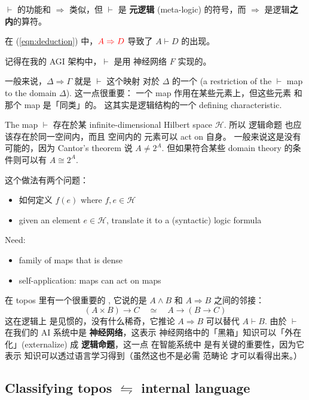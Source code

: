 $\vdash$ 的功能和 $\Rightarrow$ 类似，但 $\vdash$ 是 \textbf{元逻辑} (meta-logic) 的符号，而 $\Rightarrow$ 是逻辑\textbf{之内}的算符。

在 (\ref{eqn:deduction}) 中，${\color{red} A \Rightarrow D}$ 导致了 $A \vdash D$ 的出现。

记得在我的 AGI 架构中，$\vdash$ 是用 神经网络 $F$ 实现的。 

一般来说，$\Delta \Rightarrow \Gamma$ 就是 $\vdash$ 这个映射 对於 $\Delta$ 的一个  (a restriction of the $\vdash$ map to the domain $\Delta$).  这一点很重要： 一个 map 作用在某些元素上，但这些元素 和那个 map 是「同类」的。 这其实是逻辑结构的一个 defining characteristic.

The map $\vdash$ 存在於某 infinite-dimensional Hilbert space $\mathcal{H}$.  所以 逻辑命题 也应该存在於同一空间内，而且 空间内的 元素可以 act on 自身。 一般来说这是没有可能的，因为 Cantor's theorem 说 $A \neq 2^A$.  但如果符合某些 domain theory 的条件则可以有 $A \cong 2^A$.

这个做法有两个问题：
\begin{itemize}
	\item 如何定义 $f(e)$ where $f, e \in \mathcal{H}$
	\item given an element $e \in \mathcal{H}$, translate it to a (syntactic) logic formula
\end{itemize}

Need:
\begin{itemize}
	\item family of maps that is dense
	\item self-application:  maps can act on maps
\end{itemize}


在 topos 里有一个很重要的 ,  它说的是 $A \wedge B$ 和 $A \Rightarrow B$ 之间的邻接：
\begin{equation}
(A \times B) \rightarrow C \quad \simeq \quad A \rightarrow (B \rightarrow C)
\end{equation}
这在逻辑上 是见惯的，没有什么稀奇，它推论 $A \Rightarrow B$ 可以替代 $A \vdash B$.  由於 $\vdash$ 在我们的 AI 系统中是 \textbf{神经网络}，这表示 神经网络中的「黑箱」知识可以「外在化」(externalize) 成 \textbf{逻辑命题}，这一点 在智能系统中 是有关键的重要性，因为它表示 知识可以透过语言学习得到（虽然这也不是必需 范畴论 才可以看得出来。） 

\subsection{Classifying topos $\leftrightharpoons$ internal language}

